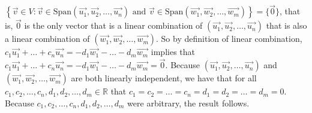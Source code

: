 \documentclass[12pt]{article}
\newenvironment{problem}[2][Problem]
{
	\begin{trivlist} 
		\item[\hskip \labelsep {\bfseries #1 #2:}]
	}
{
	\end{trivlist}
	}
\newenvironment{solution}[1][Solution]
{
	\begin{trivlist} 
		\item[\hskip \labelsep {\itshape #1:}]
	}
	{
	\end{trivlist}
}
\begin{document}
\begin{problem}{3}
\begin{solution}
\newline
$\left\{ \vec{v} \in V: \vec{v} \in \text{Span}(\vec{u_1},\vec{u_2}, \dots , \vec{u_n}) \text{ and } \vec{v} \in \text{Span}(\vec{w_1},\vec{w_2}, \dots , \vec{w_m}) \right\} =\{\vec{0}\}$, that is, $\vec{0}$ is the only vector that is a linear combination of $(\vec{u_1},\vec{u_2}, \dots , \vec{u_n})$ that is also a linear combination of $(\vec{w_1},\vec{w_2}, \dots , \vec{w_m})$. So by definition of linear combination, $c_1 \vec{u_1} + \dots + c_n \vec{u_n} = -d_1 \vec{w_1} - \dots -d_m \vec{w_m}$ implies that $c_1 \vec{u_1} + \dots + c_n \vec{u_n} = -d_1 \vec{w_1} - \dots -d_m \vec{w_m}=\vec{0}$. Because $(\vec{u_1},\vec{u_2}, \dots , \vec{u_n})$ and $(\vec{w_1},\vec{w_2}, \dots , \vec{w_m})$ are both linearly independent, we have that for all $c_1,c_2,\dots,c_n, d_1,d_2,\dots,d_m \in \mathbb{R}$ that $c_1=c_2=\dots=c_n=d_1=d_2=\dots=d_m=0$. Because $c_1,c_2,\dots,c_n,d_1,d_2,\dots,d_m$ were arbitrary, the result follows.
%
%
%
%





\end{solution}
\end{problem}
\end{document}
